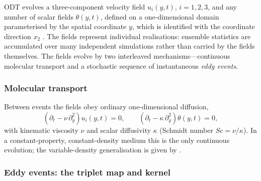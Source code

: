 \documentclass[lineno]{JFM-FLM_Au}
\begin{document}
ODT evolves a three-component velocity field $u_i(y,t)$, $i=1,2,3$, and any
number of scalar fields $\theta(y,t)$, defined on a one-dimensional domain
parameterised by the spatial coordinate $y$, which is identified with the
coordinate direction $x_2$ \citep{Kerstein2001}. The fields represent
individual realisations: ensemble statistics are accumulated over many
independent simulations rather than carried by the fields themselves. The
fields evolve by two interleaved mechanisms---continuous molecular
transport and a stochastic sequence of instantaneous \emph{eddy events}.

\subsubsection{Molecular transport}

Between events the fields obey ordinary one-dimensional diffusion,
\begin{equation}
  \left(\partial_t-\nu\,\partial_y^2\right)u_i(y,t)=0,
  \qquad
  \left(\partial_t-\kappa\,\partial_y^2\right)\theta(y,t)=0,
  \label{eq:diffusion}
\end{equation}
with kinematic viscosity $\nu$ and scalar diffusivity $\kappa$
(Schmidt number $\mathit{Sc}=\nu/\kappa$). In a constant-property,
constant-density medium this is the only continuous evolution; the
variable-density generalisation is given by \citet{AshurstKerstein2005}.

\subsubsection{Eddy events: the triplet map and kernel}
\end{document}
